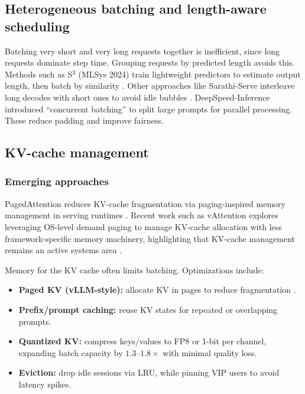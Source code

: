 \subsection{Heterogeneous batching and length-aware scheduling}\label{sec:hetero-batching}
Batching very short and very long requests together is inefficient, since long requests dominate step time. Grouping requests by predicted length avoids this. Methods such as S$^3$ (MLSys 2024) train lightweight predictors to estimate output length, then batch by similarity \cite{helix2023}. Other approaches like Sarathi-Serve interleave long decodes with short ones to avoid idle bubbles \cite{tetriinfer2023}. DeepSpeed-Inference introduced ``concurrent batching'' to split large prompts for parallel processing. These reduce padding and improve fairness.

\subsection{KV-cache management}\label{sec:kv-cache-mgmt}
\subsubsection{Emerging approaches}
PagedAttention reduces KV-cache fragmentation via paging-inspired memory management in serving runtimes \cite{vllm_pagedattention}. Recent work such as vAttention explores leveraging OS-level demand paging to manage KV-cache allocation with less framework-specific memory machinery, highlighting that KV-cache management remains an active systems area \cite{vattention_2024}.

Memory for the KV cache often limits batching. Optimizations include:
\begin{itemize}
  \item \textbf{Paged KV (vLLM-style):} allocate KV in pages to reduce fragmentation \cite{pope2023exegpt}.
  \item \textbf{Prefix/prompt caching:} reuse KV states for repeated or overlapping prompts.
  \item \textbf{Quantized KV:} compress keys/values to FP8 or 1-bit per channel, expanding batch capacity by $1.3$--$1.8\times$ with minimal quality loss.
  \item \textbf{Eviction:} drop idle sessions via LRU, while pinning VIP users to avoid latency spikes.
\end{itemize}

